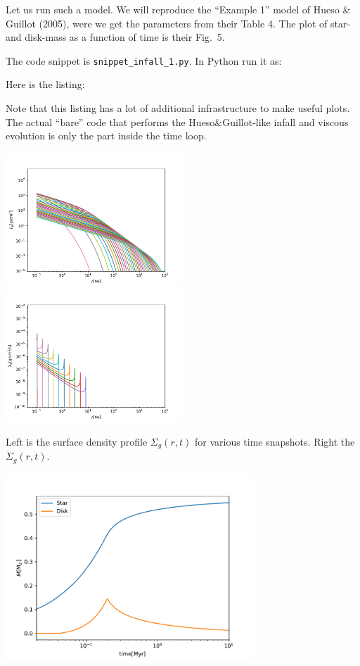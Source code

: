 \documentclass{book}
\newcommand{\code}[1]{{\small\tt #1}}
\begin{document}
Let us run such a model. We will reproduce the ``Example 1'' model of
Hueso \& Guillot (2005), were we get the parameters from their Table 4.
The plot of star- and disk-mass as a function of time is their Fig.~5.

The code snippet is
\code{snippet\_infall\_1.py}. In Python run it as:
\begin{codebox}
\end{codebox}
Here is the listing:

Note that this listing has a lot of additional infrastructure to make
useful plots. The actual ``bare'' code that performs the
Hueso\&Guillot-like infall and viscous evolution is only the part inside the time loop.\\
\centerline{\includegraphics[width=0.5\textwidth]{../snippets/fig_snippet_infall_1_1.pdf}
  \includegraphics[width=0.5\textwidth]{../snippets/fig_snippet_infall_1_2.pdf}}
Left is the surface density profile $\Sigma_g(r,t)$ for various time snapshots. Right the
$\dot\Sigma_g(r,t)$.\\
\centerline{\includegraphics[width=0.7\textwidth]{../snippets/fig_snippet_infall_1_3.pdf}}
\end{document}
